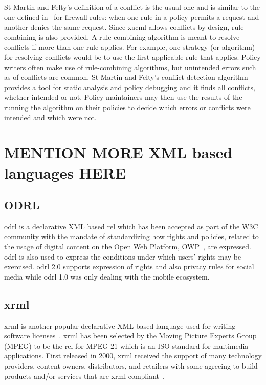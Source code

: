 St-Martin and Felty's definition of a conflict is the usual one and is similar to the one defined in~\cite{CaprettaSFM07} for firewall rules: when one rule in a policy permits a request and another denies the same request. Since \ac{xacml} allows conflicts by design, rule-combining is also provided. A rule-combining algorithm is meant to resolve conflicts if more than one rule applies. For example, one strategy (or algorithm) for resolving conflicts would be to use the first applicable rule that applies. Policy writers often make use of rule-combining algorithms, but unintended errors such as of conflicts are common.
St-Martin and Felty's conflict detection algorithm provides a tool for static analysis and policy debugging and it finds all conflicts, whether intended or not. Policy maintainers may then use the results of the running the algorithm on their policies to decide which errors or conflicts were intended and which were not.




\section{MENTION MORE XML based languages HERE}

\subsection{ODRL}

\ac{odrl} is a declarative XML based \ac{rel} which has been accepted as part of the W3C community with the mandate of standardizing how rights and policies, related to the usage of digital content on the Open Web Platform, OWP~\cite{openwebplatform}, are expressed. \ac{odrl} is also used to express the conditions under which users' rights may be exercised. \ac{odrl} 2.0 supports expression of rights and also privacy rules for social media while \ac{odrl} 1.0 was only dealing with the mobile ecosystem. 

\subsection{xrml}
\ac{xrml} is another popular declarative XML based language used for writing software licenses~\cite{HalpernW08}. \ac{xrml} has been selected by the Moving Picture Experts Group (MPEG) to be the \ac{rel} for MPEG-21 which is an ISO standard for multimedia applications. First released in 2000, \ac{xrml} received the support of many technology providers, content owners, distributors, and retailers with some agreeing to build products and/or services that are \ac{xrml} compliant~\cite{HalpernW08}.


